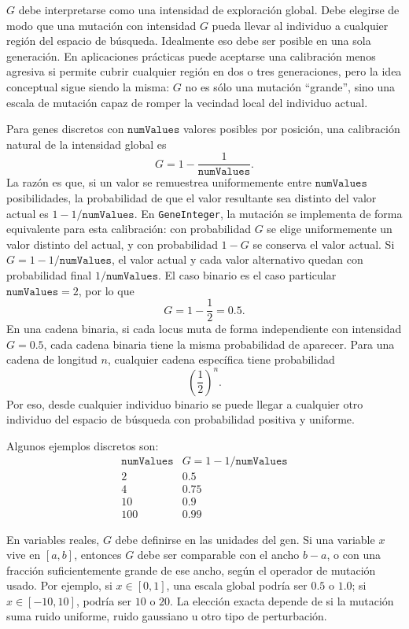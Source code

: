 \documentclass[11pt]{article}
\begin{document}
\(G\) debe interpretarse como una intensidad de exploraci\'on global. Debe
elegirse de modo que una mutaci\'on con intensidad \(G\) pueda llevar al
individuo a cualquier regi\'on del espacio de b\'usqueda. Idealmente eso debe
ser posible en una sola generaci\'on. En aplicaciones pr\'acticas puede
aceptarse una calibraci\'on menos agresiva si permite cubrir cualquier regi\'on
en dos o tres generaciones, pero la idea conceptual sigue siendo la misma:
\(G\) no es s\'olo una mutaci\'on ``grande'', sino una escala de mutaci\'on capaz
de romper la vecindad local del individuo actual.

Para genes discretos con \(\texttt{numValues}\) valores posibles por posici\'on,
una calibraci\'on natural de la intensidad global es
\[
G = 1 - \frac{1}{\texttt{numValues}}.
\]
La raz\'on es que, si un valor se remuestrea uniformemente entre
\(\texttt{numValues}\) posibilidades, la probabilidad de que el valor resultante
sea distinto del valor actual es \(1 - 1/\texttt{numValues}\). En
\texttt{GeneInteger}, la mutaci\'on se implementa de forma equivalente para esta
calibraci\'on: con probabilidad \(G\) se elige uniformemente un valor distinto
del actual, y con probabilidad \(1-G\) se conserva el valor actual. Si
\(G=1-1/\texttt{numValues}\), el valor actual y cada valor alternativo quedan
con probabilidad final \(1/\texttt{numValues}\). El caso binario es el caso
particular \(\texttt{numValues}=2\), por lo que
\[
G = 1 - \frac{1}{2} = 0.5.
\]
En una cadena binaria, si cada locus muta de forma independiente con intensidad
\(G=0.5\), cada cadena binaria tiene la misma probabilidad de aparecer. Para
una cadena de longitud \(n\), cualquier cadena espec\'ifica tiene probabilidad
\[
\left(\frac{1}{2}\right)^n.
\]
Por eso, desde cualquier individuo binario se puede llegar a cualquier otro
individuo del espacio de b\'usqueda con probabilidad positiva y uniforme.

Algunos ejemplos discretos son:
\[
\begin{array}{c|c}
\texttt{numValues} & G = 1 - 1/\texttt{numValues} \\
\hline
2 & 0.5 \\
4 & 0.75 \\
10 & 0.9 \\
100 & 0.99
\end{array}
\]

En variables reales, \(G\) debe definirse en las unidades del gen. Si una
variable \(x\) vive en \([a,b]\), entonces \(G\) debe ser comparable con el
ancho \(b-a\), o con una fracci\'on suficientemente grande de ese ancho, seg\'un
el operador de mutaci\'on usado. Por ejemplo, si \(x\in[0,1]\), una escala
global podr\'ia ser \(0.5\) o \(1.0\); si \(x\in[-10,10]\), podr\'ia ser \(10\)
o \(20\). La elecci\'on exacta depende de si la mutaci\'on suma ruido uniforme,
ruido gaussiano u otro tipo de perturbaci\'on.
\end{document}

